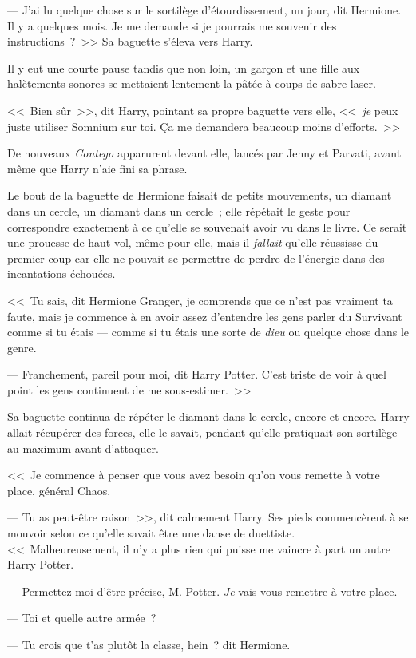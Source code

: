 --- J'ai lu quelque chose sur le sortilège d'étourdissement, un jour, dit Hermione. Il y a quelques mois. Je me demande si je pourrais me souvenir des instructions~?~>> Sa baguette s'éleva vers Harry.

Il y eut une courte pause tandis que non loin, un garçon et une fille aux halètements sonores se mettaient lentement la pâtée à coups de sabre laser.

<<~Bien sûr~>>, dit Harry, pointant sa propre baguette vers elle, <<~\emph{je} peux juste utiliser Somnium sur toi. Ça me demandera beaucoup moins d'efforts.~>>

De nouveaux \emph{Contego} apparurent devant elle, lancés par Jenny et Parvati, avant même que Harry n'aie fini sa phrase.

Le bout de la baguette de Hermione faisait de petits mouvements, un diamant dans un cercle, un diamant dans un cercle~; elle répétait le geste pour correspondre exactement à ce qu'elle se souvenait avoir vu dans le livre. Ce serait une prouesse de haut vol, même pour elle, mais il \emph{fallait} qu'elle réussisse du premier coup car elle ne pouvait se permettre de perdre de l'énergie dans des incantations échouées.

<<~Tu sais, dit Hermione Granger, je comprends que ce n'est pas vraiment ta faute, mais je commence à en avoir assez d'entendre les gens parler du Survivant comme si tu étais — comme si tu étais une sorte de \emph{dieu} ou quelque chose dans le genre.

--- Franchement, pareil pour moi, dit Harry Potter. C'est triste de voir à quel point les gens continuent de me sous-estimer.~>>

Sa baguette continua de répéter le diamant dans le cercle, encore et encore. Harry allait récupérer des forces, elle le savait, pendant qu'elle pratiquait son sortilège au maximum avant d'attaquer.

<<~Je commence à penser que vous avez besoin qu'on vous remette à votre place, général Chaos.

--- Tu as peut-être raison~>>, dit calmement Harry. Ses pieds commencèrent à se mouvoir selon ce qu'elle savait être une danse de duettiste. <<~Malheureusement, il n'y a plus rien qui puisse me vaincre à part un autre Harry Potter.

--- Permettez-moi d'être précise, M. Potter. \emph{Je} vais vous remettre à votre place.

--- Toi et quelle autre armée~?

--- Tu crois que t'as plutôt la classe, hein~? dit Hermione.

